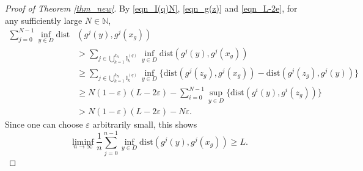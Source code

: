 \documentclass{amsart}
\theoremstyle{definition}
\numberwithin{equation}{section}
\numberwithin{figure}{section}
\begin{document}
\begin{proof}[Proof of Theorem \ref{thm_new}]
By \eqref{eqn_I(q)N}, \eqref{eqn_g(z)} and \eqref{eqn_L-2e}, 
for any sufficiently large $N\in\mathbb{N}$, 
\begin{align*}
\sum_{j=0}^{N-1}\inf_{y\in D}\mathrm{dist} &(g^j(y),g^j(x_g))\\
&>
\sum_{j\in \bigcup_{k=1}^{k_N} \mathbb{I}_k^{(q)}}
\inf_{y\in D}\mathrm{dist}(g^j(y),g^j(x_g))\\
&\geq 
\sum_{j\in \bigcup_{k=1}^{k_N} \mathbb{I}_k^{(q)}}
\inf_{y\in D}\bigl\{\mathrm{dist}(g^j(z_g),g^j(x_g))-\mathrm{dist}(g^j(z_g),g^j(y))\bigr\}\\
&\geq N(1-\varepsilon)(L-2\varepsilon)-\sum_{i=0}^{N-1}\sup_{y\in D}\{\mathrm{dist}(g^i(y),g^i(z_g))\}\\
&>N(1-\varepsilon)(L-2\varepsilon)-N\varepsilon.
\end{align*}
Since one can choose $\varepsilon$ arbitrarily small, this shows
$$\liminf_{n\rightarrow\infty}\frac1{n}\sum_{j=0}^{n-1}\inf_{y\in D}\mathrm{dist}(g^j(y),g^j(x_g))\geq L.$$



\end{proof}
\end{document}
